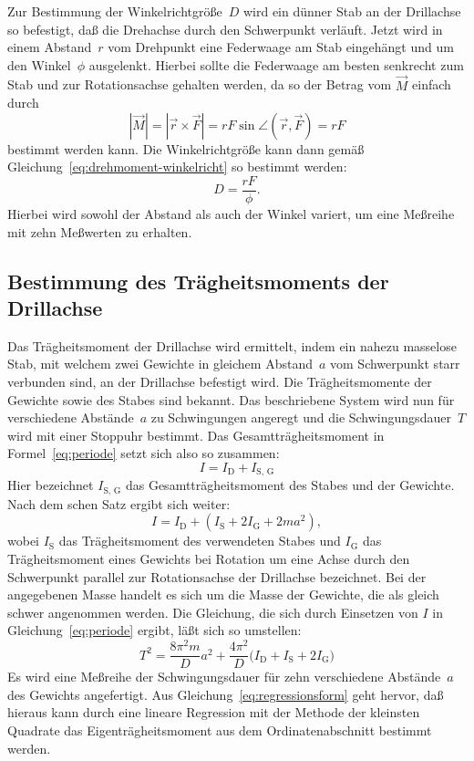Zur Bestimmung der Winkelrichtgröße~$D$ wird ein dünner Stab an der
Drillachse so befestigt, daß die Drehachse durch den Schwerpunkt
verläuft.  Jetzt wird in einem Abstand~$r$ vom Drehpunkt eine Federwaage
am Stab eingehängt und um den Winkel~$\phi$ ausgelenkt.  Hierbei sollte
die Federwaage am besten senkrecht zum Stab und zur Rotationsachse
gehalten werden, da so der Betrag vom $\vec{M}$ einfach durch
\begin{equation}
  | \vec{M} | = | \vec{r} \times \vec{F} | = r F \sin \angle(\vec{r},
  \vec{F}) = r F
\end{equation}
bestimmt werden kann.  Die Winkelrichtgröße kann dann gemäß
Gleichung~\eqref{eq:drehmoment-winkelricht} so bestimmt werden:
\begin{equation}
  \label{eq:winkelricht-kraft-abstand-winkel}
  D = \frac{r F}{\phi}.
\end{equation}
Hierbei wird sowohl der Abstand als auch der Winkel variert, um eine
Meßreihe mit zehn Meßwerten zu erhalten.

\subsection{Bestimmung des Trägheitsmoments der Drillachse}

Das Trägheitsmoment der Drillachse wird ermittelt, indem ein nahezu
masselose Stab, mit welchem zwei Gewichte in gleichem Abstand~$a$ vom
Schwerpunkt starr verbunden sind, an der Drillachse befestigt wird.  Die
Trägheitsmomente der Gewichte sowie des Stabes sind bekannt.  Das
beschriebene System wird nun für verschiedene Abstände~$a$ zu
Schwingungen angeregt und die Schwingungsdauer~$T$ wird mit einer
Stoppuhr bestimmt.  Das Gesamtträgheitsmoment in
Formel~\eqref{eq:periode} setzt sich also so zusammen:
\begin{equation}
  I = I_\text{D} + I_\text{S, G}
\end{equation}
Hier bezeichnet $I_\text{S, G}$ das Gesamtträgheitsmoment des Stabes und
der Gewichte.  Nach dem schen Satz ergibt sich weiter:
\begin{equation}
  \label{eq:gesamttraegheitsmoment}
  I = I_\text{D} + \left(I_\text{S} + 2I_\text{G} +  2m a^2\right),
\end{equation}
wobei $I_\text{S}$ das Trägheitsmoment des verwendeten Stabes und
$I_\text{G}$ das Trägheitsmoment eines Gewichts bei Rotation um eine
Achse durch den Schwerpunkt parallel zur Rotationsachse der Drillachse
bezeichnet.  Bei der angegebenen Masse handelt es sich um die Masse der
Gewichte, die als gleich schwer angenommen werden.  Die Gleichung, die
sich durch Einsetzen von $I$ in Gleichung~\eqref{eq:periode} ergibt,
läßt sich so umstellen:
\begin{equation}
  \label{eq:regressionsform}
  T^2 = \frac{8\pi^2 m}{D} a^2 + \frac{4\pi^2}{D}\big(I_\text{D} 
  + I_\text{S} + 2I_\text{G}\big)
\end{equation}
Es wird eine Meßreihe der Schwingungsdauer für zehn verschiedene
Abstände~$a$ des Gewichts angefertigt.  Aus
Gleichung~\eqref{eq:regressionsform} geht hervor, daß hieraus kann durch
eine lineare Regression mit der Methode der kleinsten Quadrate das
Eigenträgheitsmoment aus dem Ordinatenabschnitt bestimmt werden.

